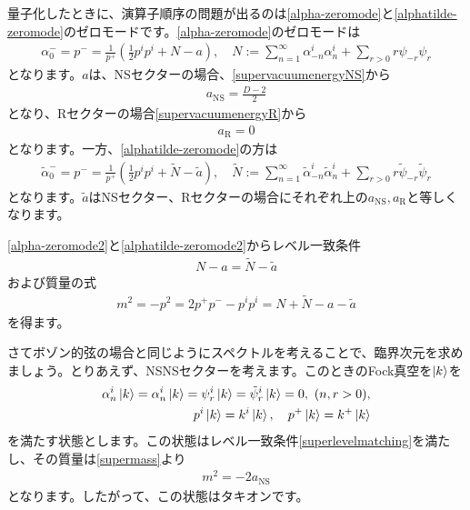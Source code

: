 \documentclass[report,paper=a4, fontsize=12pt, line_length=16cm, number_of_lines=34,dvipdfmx]{jlreq}
\numberwithin{equation}{chapter}
\numberwithin{equation}{section}
\newcommand{\alphat}{\tilde{\alpha}}
\newcommand{\Nt}{\widetilde{N}}
\newcommand{\at}{\tilde{a}}
\newcommand{\psit}{\tilde{\psi}}
\newcommand{\aNS}{a_{\mathrm{NS}}}
\newcommand{\aR}{a_{\mathrm{R}}}
\begin{document}
量子化したときに、演算子順序の問題が出るのは\eqref{alpha-zeromode}と\eqref{alphatilde-zeromode}のゼロモードです。\eqref{alpha-zeromode}のゼロモードは
\begin{align}
  \alpha^{-}_{0}=p^{-}=\frac{1}{p^{+}}\left(\frac12 p^{i}p^{i}+N-a  \right),\quad N:=\sum_{n=1}^{\infty}\alpha_{-n}^{i}\alpha_{n}^{i}+\sum_{r>0}r\psi_{-r}\psi_{r}\label{alpha-zeromode2}
\end{align}
となります。$a$は、NSセクターの場合、\eqref{supervacuumenergyNS}から
\begin{align}
  \aNS=\frac{D-2}{2}
\end{align}
となり、Rセクターの場合\eqref{supervacuumenergyR}から
\begin{align}
  \aR=0
\end{align}
となります。一方、\eqref{alphatilde-zeromode}の方は
\begin{align}
  \alphat^{-}_{0}=p^{-}=\frac{1}{p^{+}}\left(\frac12 p^{i}p^{i}+\Nt-\at  \right),\quad \Nt:=\sum_{n=1}^{\infty}\alphat_{-n}^{i}\alphat_{n}^{i}+\sum_{r>0}r\psit_{-r}\psit_{r}\label{alphatilde-zeromode2}
\end{align}
となります。$\at$はNSセクター、Rセクターの場合にそれぞれ上の$\aNS,\aR$と等しくなります。

\eqref{alpha-zeromode2}と\eqref{alphatilde-zeromode2}からレベル一致条件
\begin{align}
  N-a=\Nt-\at\label{superlevelmatching}
\end{align}
および質量の式
\begin{align}
  m^2=-p^2=2p^{+}p^{-}-p^{i}p^{i}=N+\Nt-a-\at\label{supermass}
\end{align}
を得ます。

さてボゾン的弦の場合と同じようにスペクトルを考えることで、臨界次元を求めましょう。とりあえず、NSNSセクターを考えます。このときのFock真空を$\ket{k}$を
\begin{align}
  \alpha_{n}^{i}\ket{k}=\alpha_{n}^{i}\ket{k}=\psi_{r}^{i}\ket{k}=\psit_{r}^{i}\ket{k}=0,\ (n,r>0),\nonumber\\
  p^{i}\ket{k}=k^i\ket{k},\quad p^{+}\ket{k}=k^{+}\ket{k}
\end{align}
を満たす状態とします。この状態はレベル一致条件\eqref{superlevelmatching}を満たし、その質量は\eqref{supermass}より
\begin{align}
  m^2=-2\aNS
\end{align}
となります。したがって、この状態はタキオンです。
\end{document}
